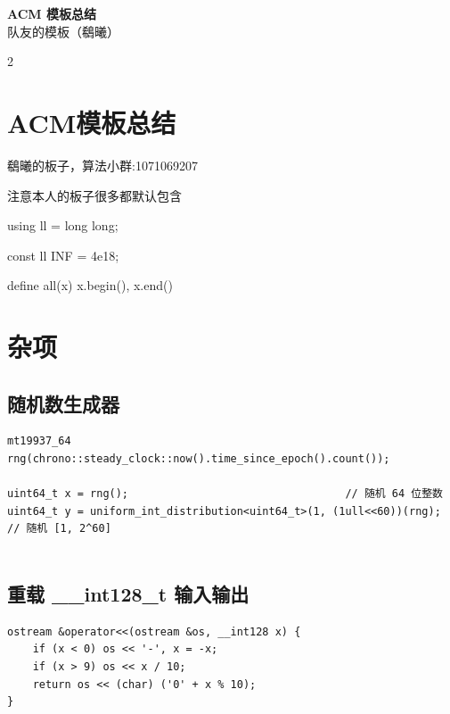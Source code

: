 \documentclass[10pt]{article}
\begin{document}
\begin{center}
    {\Huge\bfseries ACM 模板总结}\\[6pt]
    {\large 队友的模板（鵗曦）}
\end{center}

\tableofcontents
\vspace{1em}

\begin{multicols*}{2}

\section{ACM模板总结}


鵗曦的板子，算法小群:1071069207 \par

注意本人的板子很多都默认包含 \par

using ll = long long; \par

const ll INF = 4e18; \par

define all(x) x.begin(), x.end() \par


\section{杂项}


\subsection{随机数生成器}


\begin{verbatim}
mt19937_64 rng(chrono::steady_clock::now().time_since_epoch().count());

uint64_t x = rng();                                  // 随机 64 位整数
uint64_t y = uniform_int_distribution<uint64_t>(1, (1ull<<60))(rng);  // 随机 [1, 2^60]


\end{verbatim}


\subsection{重载 \_\_int128\_t 输入输出}


\begin{verbatim}
ostream &operator<<(ostream &os, __int128 x) {
    if (x < 0) os << '-', x = -x;
    if (x > 9) os << x / 10;
    return os << (char) ('0' + x % 10);
}


\end{verbatim}
\end{multicols*}
\end{document}
